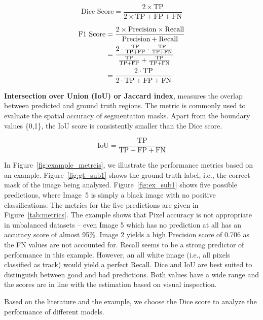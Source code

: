 \documentclass[Master,MDS,english]{BASE/twbook} %
\begin{document}
\[
\text{Dice Score} = \frac{2 \times \text{TP}}{2 \times \text{TP} + \text{FP} + \text{FN}}
\]

\begin{align*}
    \text{F1 Score} &= \frac{2 \times \text{Precision} \times \text{Recall}}{\text{Precision} + \text{Recall}} \\
    \vspace{1em}
     &= \frac{2 \cdot \frac{\text{TP}}{\text{TP} + \text{FP}} \cdot \frac{\text{TP}}{\text{TP} + \text{FN}}}{\frac{\text{TP}}{\text{TP} + \text{FP}} + \frac{\text{TP}}{\text{TP} + \text{FN}}} \\
    \vspace{1em}
     &= \frac{2 \cdot \text{TP}}{2 \cdot \text{TP} + \text{FP} + \text{FN}}
\end{align*}


\vspace{1cm}

\noindent\textbf{Intersection over Union (IoU) or Jaccard index}, measures the overlap between predicted and ground truth regions. The metric is commonly used to evaluate the spatial accuracy of segmentation masks. Apart from the boundary values \{0,1\}, the IoU score is consistently smaller than the Dice score.

\[
\text{IoU} = \frac{\text{TP}}{\text{TP} + \text{FP} + \text{FN}}
\]

\vspace{1cm}

In Figure~\ref{fig:example_metrcis}, we illustrate the performance metrics based on an example. Figure~\ref{fig:gt_sub1} shows the ground truth label, i.e., the correct mask of the image being analyzed. Figure~\ref{fig:ex_sub1} shows five possible predictions, where Image~5 is simply a black image with no positive classifications. The metrics for the five predictions are given in Figure~\ref{tab:metrics}. The example shows that Pixel accuracy is not appropriate in unbalanced datasets -- even Image 5 which has no prediction at all has an accuracy score of almost 95\%. Image 2 yields a high Precision score of 0.706 as the FN values are not accounted for.  Recall seems to be a strong predictor of performance in this example. However, an all white image (i.e., all pixels classified as track) would yield a perfect Recall. Dice and IoU are best suited to distinguish between good and bad predictions. Both values have a wide range and the scores are in line with the estimation based on visual inspection.

Based on the literature and the example, we choose the Dice score to analyze the performance of different models.
\end{document}
